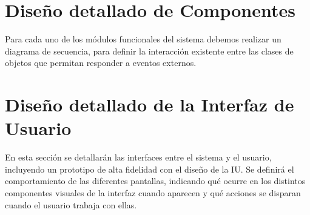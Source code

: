 \section{Diseño detallado de Componentes}
Para cada uno de los módulos funcionales del sistema debemos realizar un diagrama de secuencia, para definir la interacción existente entre las clases de objetos que permitan responder a eventos externos.

\section{Diseño detallado de la Interfaz de Usuario} 
En esta sección se detallarán las interfaces entre el sistema y el usuario, incluyendo un prototipo de alta fidelidad con el diseño de la IU. Se definirá el comportamiento de las diferentes pantallas, indicando qué ocurre en los distintos componentes visuales de la interfaz cuando aparecen y qué acciones se disparan cuando el usuario trabaja con ellas.

